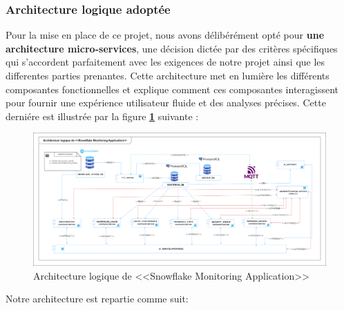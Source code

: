 \subsubsection{Architecture logique adoptée} 
\par Pour la mise en place de ce projet, nous avons délibérément opté pour \textbf{une architecture micro-services}, une décision dictée par des critères spécifiques qui s'accordent parfaitement avec les exigences de notre projet ainsi que les differentes parties prenantes.
 Cette architecture met en lumière les différents composantes fonctionnelles et explique comment ces composantes interagissent pour fournir une expérience utilisateur fluide et des analyses précises\cite{archi_log}. 
Cette derniére est illustrée par la figure \textbf{\ref{fig:arch_log}} suivante :
        \begin{figure}[H]
        \centering
        \includegraphics[width = 1\linewidth]{img/conception/archi.png}
        \caption{Architecture logique de <<Snowflake Monitoring Application>>}
    \label{fig:arch_log}
        \end{figure}
    \par Notre architecture est repartie comme suit: 
